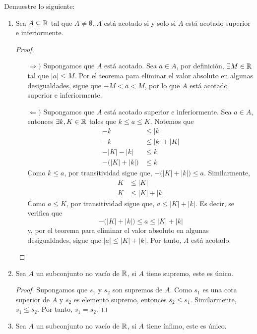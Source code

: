 Demuestre lo siguiente:

\begin{enumerate}[label=\roman*)]
 \item Sea $A\subseteq \mathbb{R}$ tal que $A\neq \emptyset$. $A$ está acotado si y solo si $A$ está acotado superior e inferiormente.
 
 \begin{proof} \leavevmode
  \begin{itemize}
   \item[$\Rightarrow)$] Supongamos que $A$ está acotado. Sea $a\in A$, por definición, $\exists M\in \mathbb{R}$ tal que $|a|\leq M$. Por el teorema para eliminar el valor absoluto en algunas desigualdades, sigue que $-M<a<M$, por lo que $A$ está acotado superior e inferiormente.
   \item[$\Leftarrow)$] Supongamos que $A$ está acotado superior e inferiormente. Sea $a\in A$, entonces $\exists k, K\in \mathbb{R}$ tales que $k\leq a \leq K$. Notemos que
   \begin{align*}
    -k &\leq |k|\\
    -k &\leq |k| + |K|\\
    -|K|-|k| &\leq k\\
    - \big(|K|+|k|\big) &\leq k
   \end{align*}
   Como $k\leq a$, por transitividad sigue que, $-\big(|K|+|k|\big) \leq a$. Similarmente,
   \begin{align*}
    K &\leq |K|\\
    K &\leq |K| + |k|
   \end{align*}
   Como $a\leq K$, por transitividad sigue que, $a\leq |K|+|k|$. Es decir, se verifica que \[-\big(|K|+|k|\big) \leq a \leq |K|+|k|\]
   y, por el teorema para eliminar el valor absoluto en algunas desigualdades, sigue que $|a| \leq |K| + |k|$. Por tanto, $A$ está acotado.
  \end{itemize}
 \end{proof}

 \item Sea $A$ un subconjunto no vacío de $\mathbb{R}$, si $A$ tiene supremo, este es único.
 
 \begin{proof} 
  Supongamos que $s_1$ y $s_2$ son supremos de $A$. Como $s_1$ es una cota superior de $A$ y $s_2$ es elemento supremo, entonces $s_2\leq s_1$. Similarmente, $s_1\leq s_2$. Por tanto, $s_1=s_2$. 
 \end{proof}

 \item Sea $A$ un subconjunto no vacío de $\mathbb{R}$, si $A$ tiene ínfimo, este es único.
 

\end{enumerate}
